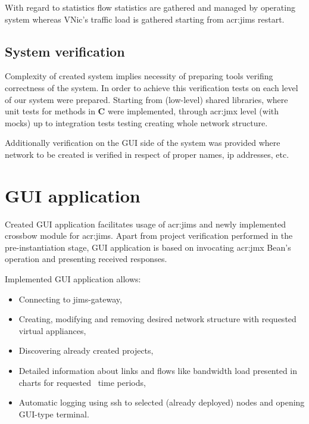 \documentclass[11pt]{book}
\begin{document}
			With regard to statistics flow statistics are gathered and managed by operating system whereas 
			VNic's traffic load is gathered starting from \gls{acr:jims} restart.
		
		\subsection{System verification}
			\label{sec:impl:verif}
		
			Complexity of created system implies necessity of preparing tools verifing correctness of the system. In order to achieve 
			this verification tests on each level of our system were prepared. Starting from (low-level) shared libraries, where unit tests
			for methods in \textbf{C} were implemented, through \gls{acr:jmx} level (with mocks) up to integration tests testing creating whole 
			network structure.
		
			Additionally verification on the GUI side of the system was provided where network to be created is verified in respect of 
			proper names, ip addresses, etc.

	\section{GUI application}
		\label{sec:impl:gui}
		
		Created GUI application facilitates usage of \gls{acr:jims} and newly implemented crossbow module for \gls{acr:jims}. Apart from project verification 
                performed in the pre-instantiation stage, GUI application is based on invocating \gls{acr:jmx} Bean's operation and presenting received responses.

		Implemented GUI application allows:
		\begin{itemize}
			\item{Connecting to jims-gateway,}
			\item{Creating, modifying and removing desired network structure with requested virtual appliances,}
			\item{Discovering already created projects,}
			\item{Detailed information about links and flows like bandwidth load presented in charts for requested \
				time periods,}
			\item{Automatic logging using ssh to selected (already deployed) nodes and opening GUI-type terminal.}
		\end{itemize}		
\end{document}
